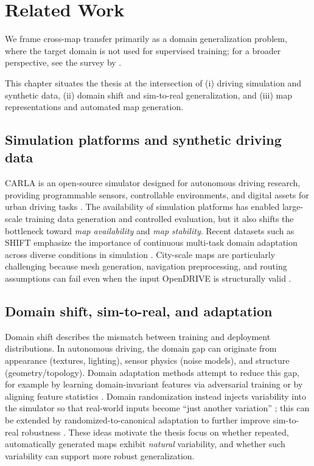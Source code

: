\section{Related Work}
\label{sec:relatedwork}

We frame cross-map transfer primarily as a domain generalization problem, where the target domain is not used for supervised training; for a broader perspective, see the survey by \citet{zhou2021dg_survey}.

This chapter situates the thesis at the intersection of (i) driving simulation and synthetic data, (ii) domain shift and sim-to-real generalization, and (iii) map representations and automated map generation.

\subsection{Simulation platforms and synthetic driving data}
CARLA is an open-source simulator designed for autonomous driving research, providing programmable sensors, controllable environments, and digital assets for urban driving tasks \citep{dosovitskiy2017carla}. The availability of simulation platforms has enabled large-scale training data generation and controlled evaluation, but it also shifts the bottleneck toward \emph{map availability} and \emph{map stability}. Recent datasets such as SHIFT emphasize the importance of continuous multi-task domain adaptation across diverse conditions in simulation \cite{sun2022shift}. City-scale maps are particularly challenging because mesh generation, navigation preprocessing, and routing assumptions can fail even when the input OpenDRIVE is structurally valid \citep{carla_opendrive_standalone}.

\subsection{Domain shift, sim-to-real, and adaptation}
Domain shift describes the mismatch between training and deployment distributions. In autonomous driving, the domain gap can originate from appearance (textures, lighting), sensor physics (noise models), and structure (geometry/topology). Domain adaptation methods attempt to reduce this gap, for example by learning domain-invariant features via adversarial training \citep{ganin2016dann} or by aligning feature statistics \citep{sun2016deepcoral}. Domain randomization instead injects variability into the simulator so that real-world inputs become ``just another variation'' \citep{tobin2017domainrandomization}; this can be extended by randomized-to-canonical adaptation to further improve sim-to-real robustness \cite{james2019simtosim}. These ideas motivate the thesis focus on whether repeated, automatically generated maps exhibit \emph{natural} variability, and whether such variability can support more robust generalization.

